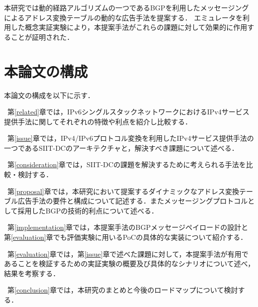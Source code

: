 本研究では動的経路アルゴリズムの一つであるBGP\cite{RFC4271}を利用したメッセージングによるアドレス変換テーブルの動的な広告手法を提案する．
エミュレータを利用した概念実証実験により，本提案手法がこれらの課題に対して効果的に作用することが証明された．



\section{本論文の構成}

本論文の構成を以下に示す．

~第\ref{related}章では，IPv6シングルスタックネットワークにおけるIPv4サービス提供手法に関してそれぞれの特徴や利点を紹介し比較する．

~第\ref{issue}章では，IPv4/IPv6プロトコル変換を利用したIPv4サービス提供手法の一つであるSIIT-DCのアーキテクチャと，解決すべき課題について述べる．

~第\ref{consideration}章では，SIIT-DCの課題を解決するために考えられる手法を比較・検討する．

~第\ref{proposal}章では，本研究において提案するダイナミックなアドレス変換テーブル広告手法の要件と構成について記述する．またメッセージングプロトコルとして採用したBGPの技術的利点について述べる．

~第\ref{implementation}章では，本提案手法のBGPメッセージペイロードの設計と第\ref{evaluation}章でも評価実験に用いるPoCの具体的な実装について紹介する．

~第\ref{evaluation}章では，第\ref{issue}章で述べた課題に対して，本提案手法が有用であることを検証するための実証実験の概要及び具体的なシナリオについて述べ，結果を考察する．

~第\ref{conclusion}章では，本研究のまとめと今後のロードマップについて検討する．


